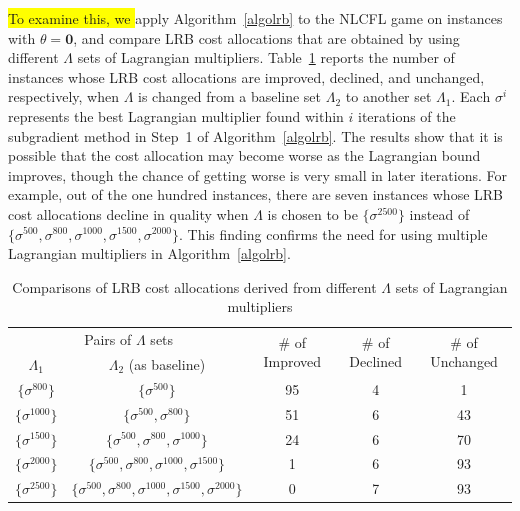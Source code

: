 \documentclass[ijoc,nonblindrev]{informs3} %
\begin{document}
\colorbox{yellow}{ To examine this, we }apply Algorithm~\ref{algolrb} to the NLCFL game on instances with $\theta=\textbf{0}$, and compare LRB cost allocations that are obtained by using different $\Lambda$ sets of Lagrangian multipliers. Table~\ref{table:CFLIterations} reports the number of instances whose LRB cost allocations are improved, declined, and unchanged, respectively, when $\Lambda$ is changed from a baseline set $\Lambda_2$ to another set $\Lambda_1$.
Each $\sigma^{i}$ represents the best Lagrangian multiplier found within $i$ iterations of the subgradient method in Step~1 of Algorithm~\ref{algolrb}. The results show that it is possible that the cost allocation may become worse as the Lagrangian bound improves, though the chance of getting worse is very small in later iterations. For example, out of the one hundred instances, there are seven instances whose LRB cost allocations decline in quality when $\Lambda$ is chosen to be $\{\sigma^{2500}\}$ instead of $\{\sigma^{500},\sigma^{800},\sigma^{1000},\sigma^{1500},\sigma^{2000}\}$. This finding confirms the need for using multiple Lagrangian multipliers in Algorithm~\ref{algolrb}.

\begin{table}[H]
\vspace{-2mm}
\centering
\tabcolsep=9pt
\small
\renewcommand\arraystretch{1.5}
\caption{\label{table:CFLIterations}
Comparisons of LRB cost allocations derived from different $\Lambda$ sets of Lagrangian multipliers}
\begin{tabular}[!h]{c c c c c}
\hline
\multicolumn{2}{c}{Pairs of $\Lambda$ sets} &\multirow{2}{*}{\# of Improved}	&\multirow{2}{*}{\# of Declined}	&\multirow{2}{*}{\# of Unchanged}\\
\cline{1-2}
$\Lambda_1$ &$\Lambda_2$ (as baseline) &\\
\hline
$\big\{\sigma^{800}\big\}$  &$\big\{\sigma^{500}\big\}$   &95	&4	&1\\

$\big\{\sigma^{1000}\big\}$ &$\big\{\sigma^{500}, \sigma^{800}\big\}$     &51	&6	&43\\

$\big\{\sigma^{1500}\big\}$ &$\big\{\sigma^{500},\sigma^{800},\sigma^{1000}\big\}$     &24	&6	&70\\

$\big\{\sigma^{2000}\big\}$ &$\big\{\sigma^{500},\sigma^{800},\sigma^{1000},\sigma^{1500}\big\}$     &1	&6	&93\\

$\big\{\sigma^{2500}\big\}$ &$\big\{\sigma^{500},\sigma^{800},\sigma^{1000},\sigma^{1500},\sigma^{2000}\big\}$     &0	&7	&93\\
\hline
\end{tabular}
\vspace{-5mm}
\end{table}
\end{document}
